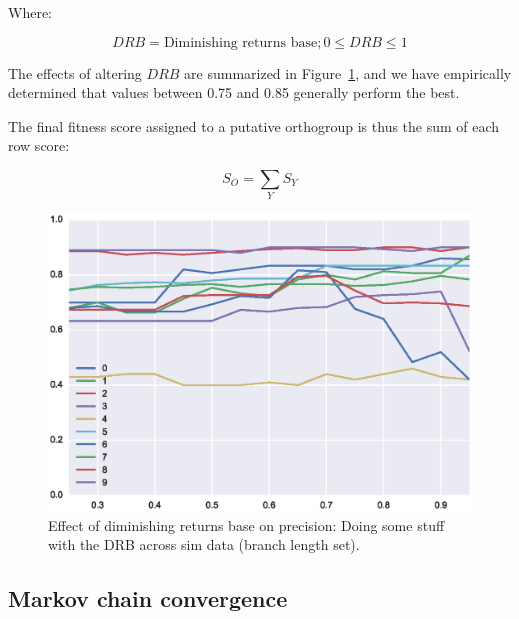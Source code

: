 \documentclass[twocolumn]{bmcart}  %
\begin{document}
Where:

\[
DRB = \text{Diminishing returns base}; 0 \leq DRB \leq 1
\]

The effects of altering $DRB$ are summarized in Figure~\ref{fig:dim_rets}, and we have empirically determined that values between 0.75 and 0.85 generally perform the best.

The final fitness score assigned to a putative orthogroup is thus the sum of each row score:

\[
S_O = \sum_{Y} S_Y
\]

\begin{figure}[t]
  \begin{center}
  \includegraphics[height=0.22\textheight]{../figures/dim_ret_precision_line.eps}
\end{center}
\caption{Effect of diminishing returns base on precision: Doing some stuff with the DRB across sim data (branch length set).}
\label{fig:dim_rets}
\end{figure}


\subsection{Markov chain convergence}\label{subsec:markovChainConvergence}
\end{document}
